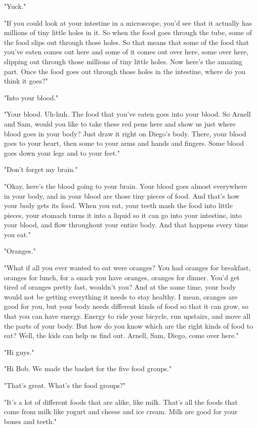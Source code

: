 "Yuck."

"If you could look at your intestine in a microscope, you'd see that it actually has millions of tiny little holes in it. So when the food goes through the tube, some of the food slips out through those holes. So that means that some of the food that you've eaten comes out here and some of it comes out over here, some over here, slipping out through those millions of tiny little holes. Now here's the amazing part. Once the food goes out through those holes in the intestine, where do you think it goes?"

"Into your blood."

"Your blood. Uh-huh. The food that you've eaten goes into your blood. So Arnell and Sam, would you like to take these red pens here and show us just where blood goes in your body? Just draw it right on Diego's body. There, your blood goes to your heart, then some to your arms and hands and fingers. Some blood goes down your legs and to your feet."

"Don't forget my brain."

"Okay, here's the blood going to your brain. Your blood goes almost everywhere in your body, and in your blood are those tiny pieces of food. And that's how your body gets its food. When you eat, your teeth mash the food into little pieces, your stomach turns it into a liquid so it can go into your intestine, into your blood, and flow throughout your entire body. And that happens every time you eat."

"Oranges."

"What if all you ever wanted to eat were oranges? You had oranges for breakfast, oranges for lunch, for a snack you have oranges, oranges for dinner. You'd get tired of oranges pretty fast, wouldn't you? And at the same time, your body would not be getting everything it needs to stay healthy. I mean, oranges are good for you, but your body needs different kinds of food so that it can grow, so that you can have energy. Energy to ride your bicycle, run upstairs, and move all the parts of your body. But how do you know which are the right kinds of food to eat? Well, the kids can help us find out. Arnell, Sam, Diego, come over here."

"Hi guys."

"Hi Bob. We made the basket for the five food groups."

"That's great. What's the food groups?"

"It's a lot of different foods that are alike, like milk. That's all the foods that come from milk like yogurt and cheese and ice cream. Milk are good for your bones and teeth."


